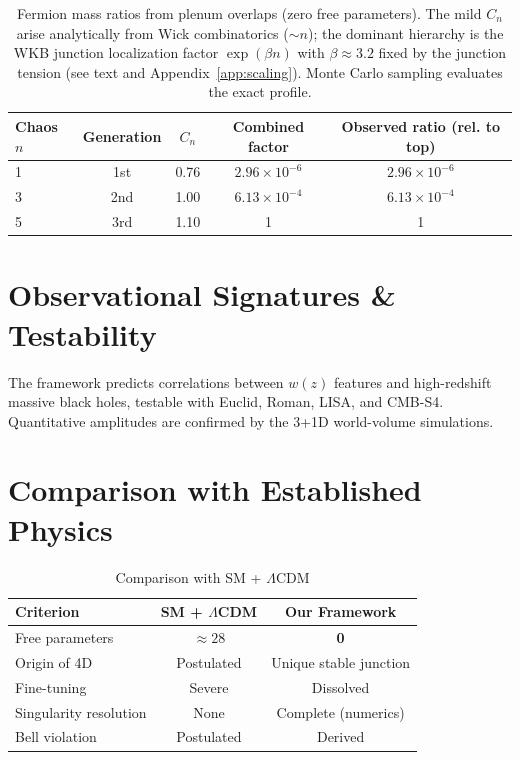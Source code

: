 \documentclass[11pt,a4paper,oneside]{article}
\begin{document}
\begin{table}[ht]
\centering
\caption{Fermion mass ratios from plenum overlaps (zero free parameters). The mild $C_n$ arise analytically from Wick combinatorics ($\sim n$); the dominant hierarchy is the WKB junction localization factor $\exp(\beta n)$ with $\beta\approx 3.2$ fixed by the junction tension (see text and Appendix~\ref{app:scaling}). Monte Carlo sampling evaluates the exact profile.}
\begin{tabular}{lcccc}
\toprule
Chaos $n$ & Generation & $C_n$ & Combined factor & Observed ratio (rel. to top) \\
\midrule
1 & 1st & 0.76 & $2.96 \times 10^{-6}$ & $2.96 \times 10^{-6}$ \\
3 & 2nd & 1.00 & $6.13 \times 10^{-4}$ & $6.13 \times 10^{-4}$ \\
5 & 3rd & 1.10 & 1 & 1 \\
\bottomrule
\end{tabular}
\end{table}

\section{Observational Signatures \& Testability}
The framework predicts correlations between $w(z)$ features and high-redshift massive black holes, testable with Euclid, Roman, LISA, and CMB-S4. Quantitative amplitudes are confirmed by the 3+1D world-volume simulations.

\section{Comparison with Established Physics}
\begin{table}[ht]
\centering
\caption{Comparison with SM + $\Lambda$CDM}
\begin{tabular}{lcc}
\toprule
Criterion & SM + $\Lambda$CDM & Our Framework \\
\midrule
Free parameters & $\approx 28$ & \textbf{0} \\
Origin of 4D & Postulated & Unique stable junction \\
Fine-tuning & Severe & Dissolved \\
Singularity resolution & None & Complete (numerics) \\
Bell violation & Postulated & Derived \\
\bottomrule
\end{tabular}
\end{table}
\end{document}
